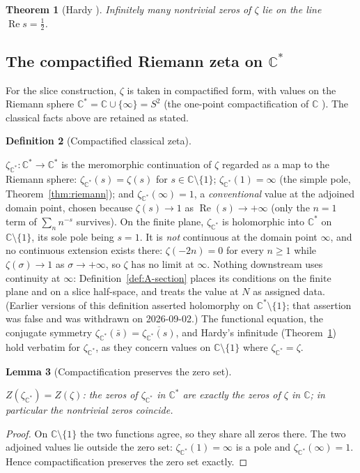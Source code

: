\documentclass[11pt]{article}
\newcommand{\CC}{\mathbb{C}}
\newcommand{\Cstar}{\CC^{*}}
\newcommand{\zetaC}{\zeta_{\Cstar}}
\DeclareMathOperator{\re}{Re}
\providecommand{\lean}[1]{}
\providecommand{\uses}[1]{}
\theoremstyle{plain}
\newtheorem{theorem}{Theorem}[section]
\newtheorem{lemma}[theorem]{Lemma}
\theoremstyle{definition}
\newtheorem{definition}[theorem]{Definition}
\theoremstyle{remark}
\begin{document}
\begin{theorem}[Hardy \cite{Hardy14}]\label{thm:hardy}
Infinitely many nontrivial zeros of $\zeta$ lie on the line $\re s=\tfrac12$.
\end{theorem}

\subsection*{The compactified Riemann zeta on \texorpdfstring{$\Cstar$}{C*}}

For the slice construction, $\zeta$ is taken in compactified form, with values on the
Riemann sphere $\Cstar=\CC\cup\{\infty\}=S^2$ (the one-point compactification of $\CC$
\cite{Munkres00}). The classical facts above are retained as stated.

\begin{definition}[Compactified classical zeta]\label{def:zeta-Cstar}
\lean{zetaC, zetaC_coe, zetaC_one, zetaC_infty}
\uses{thm:riemann}
$\zetaC:\Cstar\to\Cstar$ is the meromorphic continuation of $\zeta$ regarded as a map to
the Riemann sphere: $\zetaC(s)=\zeta(s)$ for $s\in\CC\setminus\{1\}$; $\zetaC(1)=\infty$
(the simple pole, Theorem~\ref{thm:riemann}); and $\zetaC(\infty)=1$, a \emph{conventional}
value at the adjoined domain point, chosen because $\zeta(s)\to1$ as $\re(s)\to+\infty$ (only
the $n=1$ term of $\sum_n n^{-s}$ survives). On the finite plane, $\zetaC$ is holomorphic into
$\Cstar$ on $\CC\setminus\{1\}$, its sole pole being $s=1$. It is \emph{not} continuous at the
domain point $\infty$, and no continuous extension exists there: $\zeta(-2n)=0$ for every
$n\ge1$ while $\zeta(\sigma)\to1$ as $\sigma\to+\infty$, so $\zeta$ has no limit at $\infty$.
Nothing downstream uses continuity at $\infty$: Definition~\ref{def:A-section} places its
conditions on the finite plane and on a slice half-space, and treats the value at $N$ as
assigned data. (Earlier versions of this definition asserted holomorphy on
$\Cstar\setminus\{1\}$; that assertion was false and was withdrawn on 2026-09-02.) The
functional equation, the conjugate symmetry
$\zetaC(\bar s)=\overline{\zetaC(s)}$, and Hardy's infinitude (Theorem~\ref{thm:hardy}) hold
verbatim for $\zetaC$, as they concern values on $\CC\setminus\{1\}$ where $\zetaC=\zeta$.
\end{definition}

\begin{lemma}[Compactification preserves the zero set]\label{lem:zero-Cstar}
\lean{zetaC_coe_eq_zero_iff, zetaC_zero_iff}
\uses{def:zeta-Cstar}
$Z(\zetaC)=Z(\zeta)$: the zeros of $\zetaC$ in $\Cstar$ are exactly the zeros of $\zeta$
in $\CC$; in particular the nontrivial zeros coincide.
\end{lemma}
\begin{proof}
On $\CC\setminus\{1\}$ the two functions agree, so they share all zeros there. The two
adjoined values lie outside the zero set: $\zetaC(1)=\infty$ is a pole and
$\zetaC(\infty)=1$. Hence compactification preserves the zero set exactly.
\end{proof}
\end{document}
